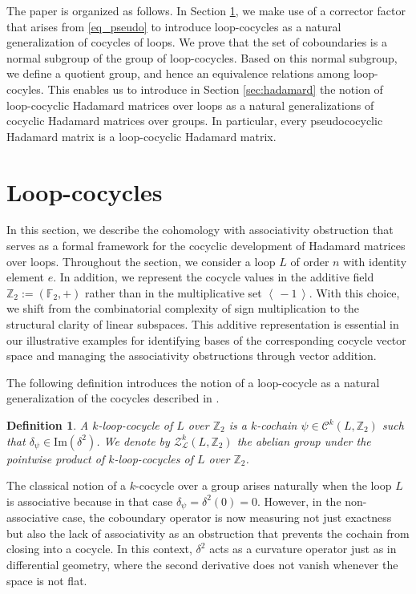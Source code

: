\documentclass[11pt,a4paper]{article}
\newtheorem{definition}[theorem]{Definition}
\begin{document}
The paper is organized as follows. In Section \ref{sec:preliminaries}, we make use of a corrector factor that arises from \eqref{eq_pseudo} to introduce loop-cocycles as a natural generalization of cocycles of loops. We prove that the set of coboundaries is a normal subgroup of the group of loop-cocycles. Based on this normal subgroup, we define a quotient group, and hence an equivalence relations among loop-cocyles. This enables us to introduce in Section \ref{sec:hadamard} the notion of loop-cocyclic Hadamard matrices over loops as a natural generalizations of cocyclic Hadamard matrices over groups. In particular, every pseudococyclic Hadamard matrix is a loop-cocyclic Hadamard matrix.

\section{Loop-cocycles}\label{sec:preliminaries}

In this section, we describe the cohomology with associativity obstruction that serves as a formal framework for the cocyclic development of Hadamard matrices over loops. Throughout the section, we consider a loop $L$ of order $n$ with identity element $e$. In addition, we represent the cocycle values in the additive field $\mathbb{Z}_2:=(\mathbb{F}_2,+)$ rather than in the multiplicative set $\left\langle\,-1\,\right\rangle$. With this choice, we shift from the combinatorial complexity of sign multiplication to the structural clarity of linear subspaces. This additive representation is essential in our illustrative examples for identifying bases of the corresponding cocycle vector space and managing the associativity obstructions through vector addition.

The following definition introduces the notion of a loop-cocycle as a natural generalization of the cocycles described in \citep{Alvarez2019}.

\begin{definition}\label{def_f_cocycle} A {\em $k$-loop-cocycle} of $L$ over $\mathbb{Z}_2$ is a $k$-cochain $\psi\in\mathcal{C}^k(L,\mathbb{Z}_2)$ such that $\delta_\psi\in\mathrm{Im}(\delta^2)$. We denote by $\mathcal{Z}_{\mathcal{L}}^k(L,\mathbb{Z}_2)$ the abelian group under the pointwise product of $k$-loop-cocycles of $L$ over $\mathbb{Z}_2$.
\end{definition}

The classical notion of a $k$-cocycle over a group arises naturally when the loop $L$ is associative because in that case $\delta_\psi=\delta^2(0)=0$. However, in the non-associative case, the coboundary operator is now measuring not just exactness but also the lack of associativity as an obstruction that prevents the cochain from closing into a cocycle. In this context, $\delta^2$ acts as a curvature operator just as in differential geometry, where the second derivative does not vanish whenever the space is not flat.
\end{document}
